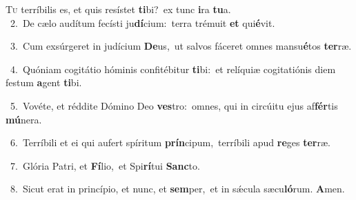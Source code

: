 \lettrine{\initial\textcolor{\initialcolor}{T}}{u} terríbilis es, et quis resístet \textbf{ti}\-bi?~\star ex tunc \textbf{i}\-ra \textbf{tu}\-a.\\
{\numbfont\textcolor{\numbcolor}{~2.}}~De cælo audítum fecísti ju\-\textbf{dí}\-cium:~\star terra trémuit \textbf{et} qui\-\textbf{é}\-vit.\par
{\numbfont\textcolor{\numbcolor}{~3.}}~Cum exsúrgeret in judícium \textbf{De}\-us,~\star ut salvos fáceret omnes mansu\-\textbf{é}\-tos \textbf{ter}\-ræ.\par
{\numbfont\textcolor{\numbcolor}{~4.}}~Quóniam cogitátio hóminis confitébitur \textbf{ti}\-bi:~\star et relíquiæ cogitatiónis diem festum \textbf{a}\-gent \textbf{ti}\-bi.\par
{\numbfont\textcolor{\numbcolor}{~5.}}~Vovéte, et réddite Dómino Deo \textbf{ves}\-tro:~\star omnes, qui in circúitu ejus af\-\textbf{fér}\-tis \textbf{mú}\-nera.\par
{\numbfont\textcolor{\numbcolor}{~6.}}~Terríbili et ei qui aufert spíritum \textbf{prín}\-cipum,~\star terríbili apud \textbf{re}\-ges \textbf{ter}\-ræ.\par
{\numbfont\textcolor{\numbcolor}{~7.}}~Glória Patri, et \textbf{Fí}\-lio,~\star et Spi\-\textbf{rí}\-tui \textbf{Sanc}\-to.\par
{\numbfont\textcolor{\numbcolor}{~8.}}~Sicut erat in princípio, et nunc, et \textbf{sem}\-per,~\star et in sǽcula sæcu\-\textbf{ló}\-rum. \textbf{A}\-men.\par
